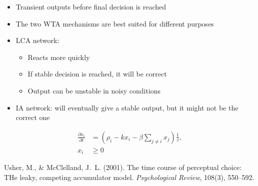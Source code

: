 \documentclass[final]{beamer}
\begin{document}
\begin{frame}[t]
\begin{tcbraster}[raster columns=4, raster column skip=10mm, raster row skip=10mm, raster equal height=rows, raster force size=false]
\begin{tcolorbox}[adjusted title=Benchmarks, add to width=-3cm]
\begin{itemize}
                \item Transient outputs before final decision is reached
            \end{itemize}
        \end{tcolorbox}
        \begin{tcolorbox}[adjusted title=Conclusions, add to width=0cm]
            \begin{itemize}
                \item The two WTA mechanisms are best suited for different purposes
                \item LCA network:
                    \begin{itemize}
                        \item Reacts more quickly
                        \item If stable decision is reached, it will be correct
                        \item Output can be unstable in noisy conditions
                    \end{itemize}
                    \item IA network: will eventually give a stable output, but it might not be the correct one
            \end{itemize}
        \end{tcolorbox}
        \begin{tcolorbox}[raster multicolumn=4,title={Leaky, Competing Accumulators (LCA)},halign title=left]
            \begin{minipage}[c][6in]{21.5cm}
                \vfill
                \vfill
                \begin{align*}
                    \frac{{\partial x}_i}{\partial t} &= \left(\rho_i - kx_i - \beta \sum_{j \neq i} x_j\right) \frac{1}{\tau},\\
                    x_i &\ge 0
                \end{align*}
                \vfill
                {\tiny Usher, M., \& McClelland, J.~L. (2001). The time course of perceptual choice: THe leaky, competing accumulator model. \textit{Psychological Review}, 108(3), 550--592.\par}
            \end{minipage}
            \hfill
            \hfill

\end{tcolorbox}
\end{tcbraster}
\end{frame}
\end{document}
